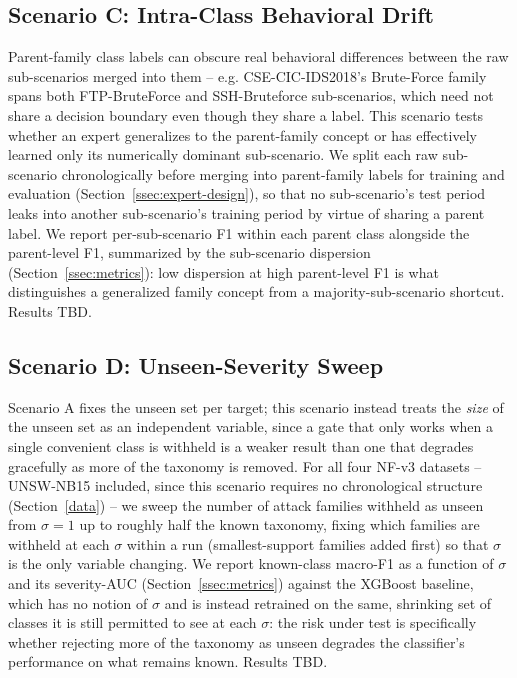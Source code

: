 \documentclass[sigconf]{acmart}
\begin{document}
\subsection{Scenario C: Intra-Class Behavioral Drift} \label{ssec:scenario-c}
Parent-family class labels can obscure real behavioral differences between the raw sub-scenarios merged into them -- e.g. CSE-CIC-IDS2018's Brute-Force family spans both FTP-BruteForce and SSH-Bruteforce sub-scenarios, which need not share a decision boundary even though they share a label. This scenario tests whether an expert generalizes to the parent-family concept or has effectively learned only its numerically dominant sub-scenario. We split each raw sub-scenario chronologically before merging into parent-family labels for training and evaluation (Section~\ref{ssec:expert-design}), so that no sub-scenario's test period leaks into another sub-scenario's training period by virtue of sharing a parent label. We report per-sub-scenario F1 within each parent class alongside the parent-level F1, summarized by the sub-scenario dispersion (Section~\ref{ssec:metrics}): low dispersion at high parent-level F1 is what distinguishes a generalized family concept from a majority-sub-scenario shortcut. Results TBD.

\subsection{Scenario D: Unseen-Severity Sweep} \label{ssec:scenario-d}
Scenario A fixes the unseen set per target; this scenario instead treats the \emph{size} of the unseen set as an independent variable, since a gate that only works when a single convenient class is withheld is a weaker result than one that degrades gracefully as more of the taxonomy is removed. For all four NF-v3 datasets -- UNSW-NB15 included, since this scenario requires no chronological structure (Section~\ref{data}) -- we sweep the number of attack families withheld as unseen from $\sigma = 1$ up to roughly half the known taxonomy, fixing which families are withheld at each $\sigma$ within a run (smallest-support families added first) so that $\sigma$ is the only variable changing. We report known-class macro-F1 as a function of $\sigma$ and its severity-AUC (Section~\ref{ssec:metrics}) against the XGBoost baseline, which has no notion of $\sigma$ and is instead retrained on the same, shrinking set of classes it is still permitted to see at each $\sigma$: the risk under test is specifically whether rejecting more of the taxonomy as unseen degrades the classifier's performance on what remains known. Results TBD.
\end{document}
